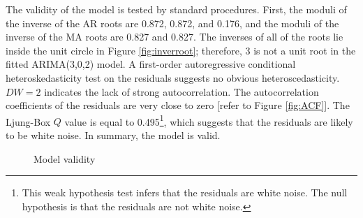 \documentclass[review,3p,times,12pt,number]{elsarticle}
\begin{document}
The validity of the model is tested by standard procedures. First, the moduli of the inverse of the AR roots are 0.872, 0.872, and 0.176, and the moduli of the inverse of the MA roots are 0.827 and 0.827. The inverses of all of the roots lie inside the unit circle in Figure \ref{fig:inverroot}; therefore, 3 is not a unit root in the fitted ARIMA(3,0,2) model. A first-order autoregressive conditional heteroskedasticity test on the residuals suggests no obvious heteroscedasticity. $DW=2$ indicates the lack of strong autocorrelation. The autocorrelation coefficients of the residuals are very close to zero [refer to Figure \ref{fig:ACF}]. The Ljung-Box $Q$ value is equal to 0.495\footnote{This weak hypothesis test infers that the residuals are white noise. The null hypothesis is that the residuals are not white noise.}, which suggests that the residuals are likely to be white noise. In summary, the model is valid.

\begin{figure}[htbp]
\centering
{}
\caption{Model validity}
\end{figure}
\end{document}
